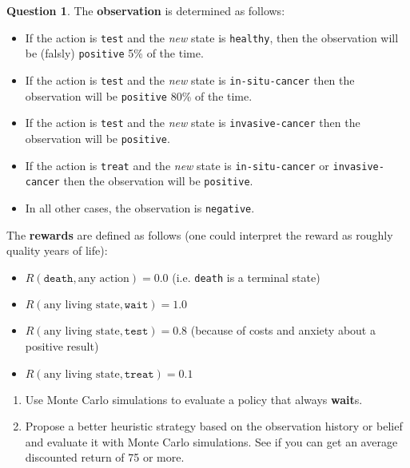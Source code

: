 \documentclass{article}
\theoremstyle{definition}
\newtheorem{question}[thm]{Question}
\begin{document}
\begin{question}
The \textbf{observation} is determined as follows:
\begin{itemize}[noitemsep]
    \item If the action is \texttt{test} and the \emph{new} state is \texttt{healthy}, then the observation will be (falsly) \texttt{positive} 5\% of the time. 
    \item If the action is \texttt{test} and the \emph{new} state is \texttt{in-situ-cancer} then the observation will be \texttt{positive} 80\% of the time.
    \item If the action is \texttt{test} and the \emph{new} state is \texttt{invasive-cancer} then the observation will be \texttt{positive}.
    \item If the action is \texttt{treat} and the \emph{new} state is \texttt{in-situ-cancer} or \texttt{invasive-cancer} then the observation will be \texttt{positive}.
    \item In all other cases, the observation is \texttt{negative}.
\end{itemize}

The \textbf{rewards} are defined as follows (one could interpret the reward as roughly quality years of life):
\begin{itemize}[noitemsep]
    \item $R(\texttt{death}, \text{any action}) = 0.0$ (i.e. \texttt{death} is a terminal state)
    \item $R(\text{any living state}, \texttt{wait}) = 1.0$
    \item $R(\text{any living state}, \texttt{test}) = 0.8$ (because of costs and anxiety about a positive result)
    \item $R(\text{any living state}, \texttt{treat}) = 0.1$
\end{itemize}

\begin{enumerate}[label=(\alph*)]
    \item Use Monte Carlo simulations to evaluate a policy that always \textbf{wait}s.
    \item Propose a better heuristic strategy based on the observation history or belief and evaluate it with Monte Carlo simulations. See if you can get an average discounted return of 75 or more.
\end{enumerate}

\end{question}
\end{document}

